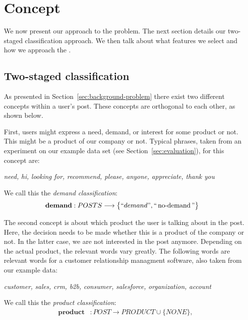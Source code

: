 \section{Concept}
\label{sec:concept}

We now present our approach to the \nto problem.
The next section details our two-staged classification approach.
We then talk about what features we select and how we approach the \emph{\documentmismatch}.

\subsection{Two-staged classification}
As presented in Section~\ref{sec:background-problem} there exist two different concepts within a user's post.
These concepts are orthogonal to each other, as shown below.

First, users might express a need, demand, or interest for some product or not.
This might be a product of our company or not.
Typical phrases, taken from an experiment on our example data set (see Section~\ref{sec:evaluation}), for this concept are:
\begin{center}
	\textit{need, hi, looking for, recommend, please, anyone, appreciate, thank you}
\end{center}
We call this the \emph{demand classification}:
\begin{align}
	\mathbf{demand}&: POSTS \longrightarrow \big\{ ``demand", ``\operatorname{no-demand}" \big\}
\end{align}

The second concept is about which product the user is talking about in the post.
Here, the decision needs to be made whether this is a product of the company or not.
In the latter case, we are not interested in the post anymore.
Depending on the actual product, the relevant words vary greatly.
The following words are relevant words for a customer relationship managment software, also taken from our example data:
\begin{center}
	\textit{customer, sales, crm, b2b, consumer, salesforce, organization, account}
\end{center}

We call this the \emph{product classification}:
\begin{align}
	\mathbf{product}&: POST \longrightarrow  PRODUCT \cup \big\{ NONE \big\}, \\
\end{align}

